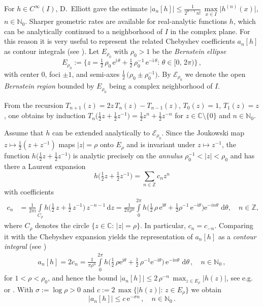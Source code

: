 \documentclass[11pt,a4paper]{scrartcl}
\renewcommand{\d}{\,\mathrm{d}}
\numberwithin{equation}{section}
\numberwithin{table}{section}
\numberwithin{figure}{section}
\newcommand{\e}{\mathrm e}
\renewcommand{\i}{\mathrm i}
\newcommand{\C}{\mathbb C}
\newcommand{\Z}{\mathbb Z}
\newcommand{\Np}{{\mathbb N}_0}
\begin{document}
For $h \in C^{\infty}(I)$, D.~Elliott \cite{El63} gave the estimate
$\big| a_n[h] \big| \leq \frac{1}{2^{n-1}\,n!}\, \max\limits_{x \in I} \big|
h^{(n)}(x)\big|$, $n \in \Np$. Sharper geometric rates are available for
real-analytic  functions $h$, which can be analytically continued to a neighborhood of $I$
in the complex plane. For this reason it is very useful to represent the related Chebyshev coefficients $a_n[h]$ as contour integrals (see \cite{El64, Wang17}).
Let $E_{\rho_0}$ with $\rho_0 > 1$ be the  \emph{Bernstein ellipse}
$$
 \textstyle E_{\rho_0} := \big\{z = \tfrac12\,\rho_0\,\e^{\i\,\theta} + \tfrac12\,\rho_0^{-1}\,\e^{-\i\,\theta}:\,\theta \in [0,\,2\pi)\big\}\,,
$$
with center $0$, foci $\pm 1$, and semi-axes $\tfrac12\,\big(\rho_0 \pm
\rho_0^{-1}\big)$. By $\mathcal{E}_{\rho_0}$ we denote the open \emph{Bernstein
region} bounded by $E_{\rho_0}$ being  a complex neighborhood of $I$.

From the recursion $T_{n+1}(z) = 2z\,T_n(z)-T_{n-1}(z)$, $T_0(z)=1$, $T_1(z)=z$, one obtains by
induction $T_n\big(\tfrac12 z + \tfrac12 z^{-1}\big) = \tfrac12 z^{n} + \tfrac12 z^{-n}$ for
$z \in \C\setminus\{0\}$ and $n \in \Np$.

Assume that $h$ can be extended analytically to
$\mathcal{E}_{\rho_0}$. Since the Joukowski map $z \mapsto \tfrac12(z+z^{-1})$ maps $|z|=\rho$ onto
$E_{\rho}$ and is invariant under $z \mapsto z^{-1}$, the function
$h\big(\tfrac12 z + \tfrac12 z^{-1}\big)$ is analytic precisely on the \emph{annulus}
$\rho_0^{-1} < |z| < \rho_0$
 and has there a Laurent
expansion
$$ \textstyle h\big(\tfrac12 z + \tfrac12 z^{-1}\big)= \sum\limits_{n\in\Z} c_n z^n$$ with coefficients
\begin{align*}
c_n &= \textstyle  \tfrac{1}{2\pi \i}\int\limits_{C_{\rho}} h\big(\tfrac12\,z + \tfrac12\,z^{-1}\big)\,z^{-n-1}\d z
= \tfrac{1}{2 \pi \rho^n}\int\limits_{0}^{2\pi} h\big(\tfrac12\,\rho\,{\mathrm e}^{\i \theta} + \tfrac12\rho^{-1}\,{\mathrm e}^{-\i \theta}\big){\mathrm e}^{-i n \theta}\,\d \theta, \quad n\in \mathbb Z,
\end{align*}
where $C_{\rho}$ denotes the circle $\{z \in \mathbb C:\,|z| = \rho\}$.
In particular, $c_n = c_{-n}.$ 
Comparing it with the Chebyshev expansion
yields the representation of $a_n[h]$ as a \emph{contour integral} (see \cite{Riv90, Wang17})
\begin{align}\label{contour}
\textstyle a_n[h] = 2 c_n = \frac{1}{\pi \rho^n} \int\limits_{0}^{2\pi} h\big( \tfrac12\,\rho \e^{\i \theta} + \tfrac12\,\rho^{-1} \e^{-\i \theta} \big)\, \e^{-\i n \theta}\, \d \theta\,,\quad n \in \Np\,,
\end{align}
for $1<\rho<\rho_0$, and hence the bound
$|a_n[h]| \leq 2\,\rho^{-n}\,\max_{z \in E_{\rho}} |h(z)|$, see e.g.\ \cite[Theorem~3.8]{Riv90} or
\cite[Theorem~8.1]{Tref13}. With $\sigma := \log \rho > 0$ and
$c := 2\,\max \{ |h(z)|:\,z \in E_{\rho}\}$  we obtain
\begin{equation}
\label{eq:expocoeffs}
\textstyle |a_n[h]| \leq c\,\e^{-\sigma n}\,, \quad n \in \Np\,.
\end{equation}
\end{document}
